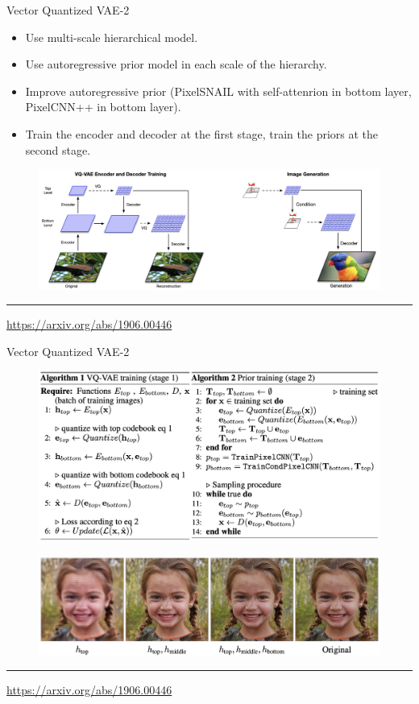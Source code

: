 \documentclass{beamer}
\begin{document}
\begin{frame}{Vector Quantized VAE-2}
	\begin{itemize}
		\item Use multi-scale hierarchical model.
		\item Use autoregressive prior model in each scale of the hierarchy.
		\item Improve autoregressive prior (PixelSNAIL with self-attenrion in bottom layer, PixelCNN++ in bottom layer).
		\item Train the encoder and decoder at the first stage, train the priors at the second stage.
	\end{itemize}
	\begin{figure}
		\centering
		\includegraphics[width=\linewidth]{figs/vqvae2}
	\end{figure}
	\vfill
	\hrule\medskip
	{\scriptsize \href{https://arxiv.org/abs/1906.00446}{https://arxiv.org/abs/1906.00446}} 
\end{frame}
\begin{frame}{Vector Quantized VAE-2}
		\begin{figure}
			\centering
			\includegraphics[width=0.9\linewidth]{figs/vqvae2_pseudo}
		\end{figure}
		\begin{figure}
			\centering
			\includegraphics[width=0.85\linewidth]{figs/vqvae2_latents}
		\end{figure}
	\vfill
	\hrule\medskip
	{\scriptsize \href{https://arxiv.org/abs/1906.00446}{https://arxiv.org/abs/1906.00446}} 
\end{frame}
\end{document}
